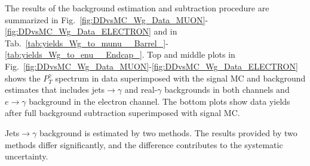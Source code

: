 The results of the background estimation and subtraction procedure are summarized in Fig.~\ref{fig:DDvsMC_Wg_Data_MUON}-\ref{fig:DDvsMC_Wg_Data_ELECTRON} and in Tab.~\ref{tab:yields_Wg_to_munu__Barrel_}-\ref{tab:yields_Wg_to_enu__Endcap_}. Top and middle plots in Fig.~\ref{fig:DDvsMC_Wg_Data_MUON}-\ref{fig:DDvsMC_Wg_Data_ELECTRON} shows the $P_T^\gamma$ spectrum in data superimposed with the signal MC and background estimates that includes jets$\rightarrow\gamma$ and real-$\gamma$ backgrounds in both channels and $e\rightarrow\gamma$ background in the electron channel. The bottom plots show data yields after full background subtraction superimposed with signal MC. 

Jets$\rightarrow\gamma$ background is estimated by two methods. The results provided by two methods differ significantly, and the difference contributes to the systematic uncertainty.

